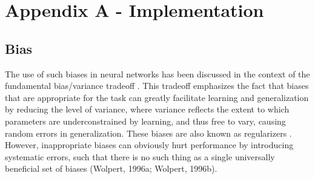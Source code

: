 
\section*{Appendix A - Implementation}
\appendix
{}



\subsection{Bias} 

The use of such biases in neural networks has been discussed in the context of the fundamental bias/variance tradeoff \citet{geman1992neural}. This tradeoff emphasizes the fact that biases that are appropriate for the task can greatly facilitate learning and generalization by reducing the level of variance, where variance reflects the extent to which parameters are underconstrained by learning, and thus free to vary, causing random errors in generalization. These biases are also known as regularizers \citet{poggio1990networks}. However, inappropriate biases can obviously hurt performance by introducing systematic errors, such that there is no such thing as a single universally beneficial set of biases (Wolpert, 1996a; Wolpert, 1996b). 

